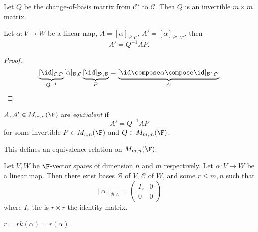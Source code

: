 \documentclass[a4paper]{article}
\newcommand*{\basis}{\mathcal}
\theoremstyle{definition}
\begin{document}
Let \(Q\) be the change-of-basis matrix from \(\basis C'\) to \(\basis C\). Then \(Q\) is an invertible \(m\times m\) matrix.

\begin{proposition}
  Let \(\alpha: V\to W\) be a linear map, \(A = [\alpha]_{\basis B,\basis C}\), \(A' = [\alpha]_{\basis B',\basis C'}\), then
  \[
    A' = Q^{-1}AP.
  \]
\end{proposition}

\begin{proof}
  \[
    \underbrace{[\id]_{\basis C,\basis C'}}_{Q^{-1}} [\alpha]_{\basis B,\basis C} \underbrace{[\id]_{\basis B',\basis B}}_P = \underbrace{[\id\compose\alpha\compose\id]_{\basis B',\basis C'}}_{A'}
  \]
\end{proof}

\begin{definition}
  \(A, A' \in M_{m,n}(\F)\) are \emph{equivalent} if
  \[
    A' = Q^{-1}AP
  \]
  for some invertible \(P\in M_{n,n}(\F)\) and \(Q\in M_{m,m}(\F)\).
\end{definition}

\begin{note}
  This defines an equivalence relation on \(M_{m,n}(\F)\).
\end{note}

\begin{proposition}
  Let \(V, W\) be \(\F\)-vector spaces of dimension \(n\) and \(m\) respectively. Let \(\alpha:V\to W\) be a linear map. Then there exist bases \(\basis B\) of \(V\), \(\basis C\) of \(W\), and some \(r\leq m,n\) such that
  \[
    [\alpha]_{\basis B,\basis C} =
    \begin{pmatrix}
      I_r & 0 \\
      0 & 0 
    \end{pmatrix}
  \]
  where \(I_r\) the is \(r\times r\) the identity matrix.
\end{proposition}

\begin{note}
  \(r = rk(\alpha) = r(\alpha)\).
\end{note}
\end{document}
